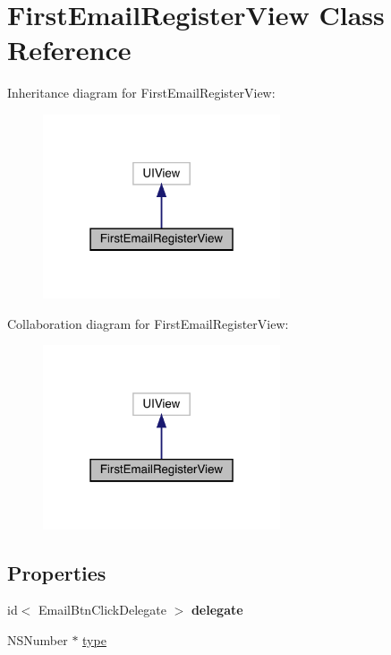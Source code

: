 \hypertarget{interface_first_email_register_view}{}\section{First\+Email\+Register\+View Class Reference}
\label{interface_first_email_register_view}


Inheritance diagram for First\+Email\+Register\+View\+:\nopagebreak
\begin{figure}[H]
\begin{center}
\leavevmode
\includegraphics[width=199pt]{interface_first_email_register_view__inherit__graph}
\end{center}
\end{figure}


Collaboration diagram for First\+Email\+Register\+View\+:\nopagebreak
\begin{figure}[H]
\begin{center}
\leavevmode
\includegraphics[width=199pt]{interface_first_email_register_view__coll__graph}
\end{center}
\end{figure}
\subsection*{Properties}
\begin{DoxyCompactItemize}
\item 
\mbox{\label{interface_first_email_register_view_adea152d0faf9792ac529c3577d7ba8ab}} 
id$<$ Email\+Btn\+Click\+Delegate $>$ {\bfseries delegate}
\item 
N\+S\+Number $\ast$ \mbox{\hyperlink{interface_first_email_register_view_aeb93d08a05d4461d6ae1df019ff48d4c}{type}}
\end{DoxyCompactItemize}


